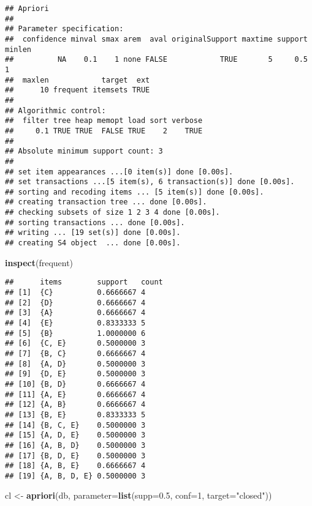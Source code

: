 \documentclass[
]{article}
\newenvironment{Shaded}{\begin{snugshade}}{\end{snugshade}}
\newcommand{\AttributeTok}[1]{\textcolor[rgb]{0.13,0.29,0.53}{#1}}
\newcommand{\DecValTok}[1]{\textcolor[rgb]{0.00,0.00,0.81}{#1}}
\newcommand{\FloatTok}[1]{\textcolor[rgb]{0.00,0.00,0.81}{#1}}
\newcommand{\FunctionTok}[1]{\textcolor[rgb]{0.13,0.29,0.53}{\textbf{#1}}}
\newcommand{\NormalTok}[1]{#1}
\newcommand{\OtherTok}[1]{\textcolor[rgb]{0.56,0.35,0.01}{#1}}
\newcommand{\StringTok}[1]{\textcolor[rgb]{0.31,0.60,0.02}{#1}}
\begin{document}
\begin{verbatim}
## Apriori
## 
## Parameter specification:
##  confidence minval smax arem  aval originalSupport maxtime support minlen
##          NA    0.1    1 none FALSE            TRUE       5     0.5      1
##  maxlen            target  ext
##      10 frequent itemsets TRUE
## 
## Algorithmic control:
##  filter tree heap memopt load sort verbose
##     0.1 TRUE TRUE  FALSE TRUE    2    TRUE
## 
## Absolute minimum support count: 3 
## 
## set item appearances ...[0 item(s)] done [0.00s].
## set transactions ...[5 item(s), 6 transaction(s)] done [0.00s].
## sorting and recoding items ... [5 item(s)] done [0.00s].
## creating transaction tree ... done [0.00s].
## checking subsets of size 1 2 3 4 done [0.00s].
## sorting transactions ... done [0.00s].
## writing ... [19 set(s)] done [0.00s].
## creating S4 object  ... done [0.00s].
\end{verbatim}

\begin{Shaded}
\begin{Highlighting}[]
\FunctionTok{inspect}\NormalTok{(frequent)}
\end{Highlighting}
\end{Shaded}

\begin{verbatim}
##      items        support   count
## [1]  {C}          0.6666667 4    
## [2]  {D}          0.6666667 4    
## [3]  {A}          0.6666667 4    
## [4]  {E}          0.8333333 5    
## [5]  {B}          1.0000000 6    
## [6]  {C, E}       0.5000000 3    
## [7]  {B, C}       0.6666667 4    
## [8]  {A, D}       0.5000000 3    
## [9]  {D, E}       0.5000000 3    
## [10] {B, D}       0.6666667 4    
## [11] {A, E}       0.6666667 4    
## [12] {A, B}       0.6666667 4    
## [13] {B, E}       0.8333333 5    
## [14] {B, C, E}    0.5000000 3    
## [15] {A, D, E}    0.5000000 3    
## [16] {A, B, D}    0.5000000 3    
## [17] {B, D, E}    0.5000000 3    
## [18] {A, B, E}    0.6666667 4    
## [19] {A, B, D, E} 0.5000000 3
\end{verbatim}

\begin{Shaded}
\begin{Highlighting}[]
\NormalTok{cl }\OtherTok{\textless{}{-}} \FunctionTok{apriori}\NormalTok{(db, }\AttributeTok{parameter=}\FunctionTok{list}\NormalTok{(}\AttributeTok{supp=}\FloatTok{0.5}\NormalTok{, }\AttributeTok{conf=}\DecValTok{1}\NormalTok{, }\AttributeTok{target=}\StringTok{"closed"}\NormalTok{))}
\end{Highlighting}
\end{Shaded}
\end{document}
